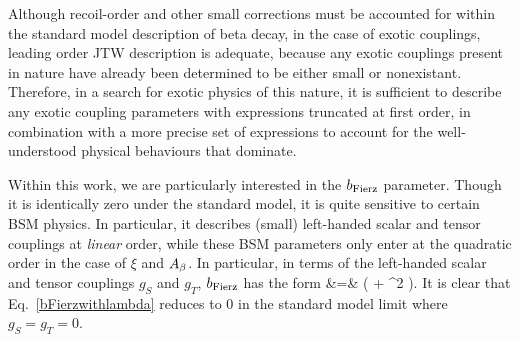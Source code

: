 Although recoil-order and other small corrections must be accounted for within the standard model description of beta decay, in the case of exotic couplings, leading order \ac{JTW} description is adequate, because any exotic couplings present in nature have already been determined to be either small or nonexistant.  Therefore, in a search for exotic physics of this nature, it is sufficient to describe any exotic coupling parameters with expressions truncated at first order, in combination with a more precise set of expressions to account for the well-understood physical behaviours that dominate.  

Within this work, we are particularly interested in the $b_{\mathrm{Fierz}}$ parameter.  Though it is identically zero under the standard model, it is quite sensitive to certain \ac{BSM} physics.  In particular, it describes (small) left-handed scalar and tensor couplings at \emph{linear} order, while these \ac{BSM} parameters only enter at the quadratic order in the case of $\xi$ and $A_{\beta}$.  In particular, in terms of the left-handed scalar and tensor couplings $g_S$ and $g_T$, $b_{\mathrm{Fierz}}$ has the form 
\bea
\bFierz &=&  \left(  + \rho^2  \right). 
\label{bFierzwithlambda}
\eea
It is clear that Eq.~\ref{bFierzwithlambda} reduces to 0 in the standard model limit where $g_S = g_T = 0$.







